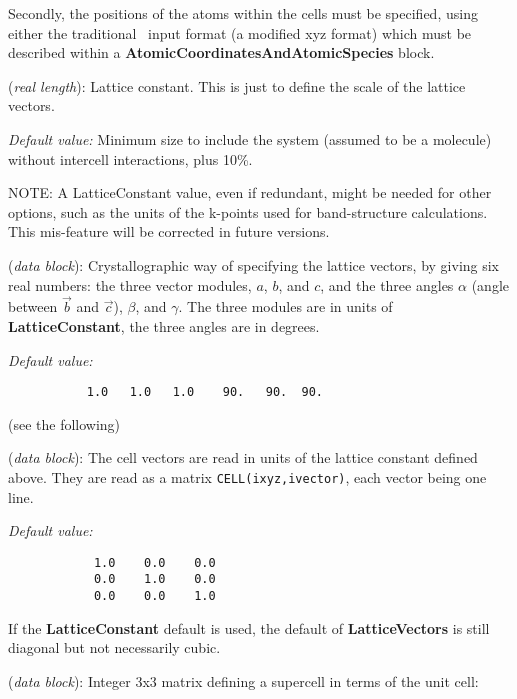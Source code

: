 Secondly, the positions of the atoms within the cells
must be specified, using either the traditional \siesta\
input format (a modified xyz format) which must be described
within
a \textbf{AtomicCoordinatesAndAtomicSpecies} block.

\begin{description}
\itemsep 10pt
\parsep 0pt
\item[\textbf{LatticeConstant}] (\textit{real length}):
Lattice constant. This is just to define the scale of the lattice vectors.

\textit{Default value:} Minimum size to include the system (assumed to be a
molecule) without intercell interactions, plus 10\%.

NOTE: A LatticeConstant value, even if redundant, might be needed for
other options, such as the units of the k-points used for
band-structure calculations. This mis-feature will be corrected in
future versions.

\item[\textbf{LatticeParameters}] (\textit{data block}):
Crystallographic way of specifying the lattice vectors, by giving
six real numbers: the three vector modules, $a$, $b$, and $c$, and
the three angles $\alpha$ (angle between $\vec b$ and $\vec c$),
$\beta$, and $\gamma$. The three modules are in units of
\textbf{LatticeConstant}, the three angles are in degrees.

\textit{Default value:}
\begin{verbatim}
           1.0   1.0   1.0    90.   90.  90.
\end{verbatim}
\noindent
(see the following)

\item[\textbf{LatticeVectors}] (\textit{data block}):
The cell vectors are read in units of the lattice constant defined above.
They are read as a matrix \texttt{CELL(ixyz,ivector)}, each vector being
one line.

\textit{Default value:}
\begin{verbatim}
            1.0    0.0    0.0
            0.0    1.0    0.0
            0.0    0.0    1.0
\end{verbatim}
\noindent
If the \textbf{LatticeConstant} default is used, the default of
\textbf{LatticeVectors} is still diagonal but not necessarily cubic.


\item[\textbf{SuperCell}] (\textit{data block}): 
Integer 3x3 matrix defining a supercell in terms of the unit cell: 


\end{description}
